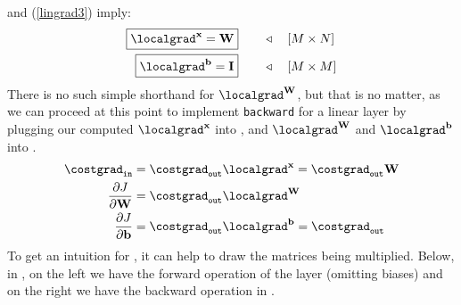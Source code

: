 \Eqns{\ref{lingrad1}} and (\ref{lingrad3}) imply:
\begin{align}
    \boxed{\localgrad^{\mathbf{x}} = \mathbf{W}} &\quad\quad \triangleleft \quad [M \times N]\\
    \boxed{\localgrad^{\mathbf{b}} = \mathbf{I}} &\quad\quad \triangleleft \quad [M \times M]
\end{align}
There is no such simple shorthand for $\localgrad^\mathbf{W}$, but that is no matter, as we can proceed at this point to implement \texttt{backward} for a linear layer by plugging our computed $\localgrad^\mathbf{x}$ into \eqn{\ref{eqn:backpropagation:backward}}, and $\localgrad^\mathbf{W}$ and $\localgrad^\mathbf{b}$ into \eqn{\ref{eqn:backpropagation:djdtheta}}.
\begin{align}
    \costgrad_{\texttt{in}} &= \costgrad_{\texttt{out}}\localgrad^{\mathbf{x}} = \costgrad_{\texttt{out}}\mathbf{W} \label{eqn:backpropagation:linear_backward_costgrad}\\
    \frac{\partial J}{\partial \mathbf{W}} &=  \costgrad_{\texttt{out}}\localgrad^{\mathbf{W}}\\
    \frac{\partial J}{\partial \mathbf{b}} &= \costgrad_{\texttt{out}}\localgrad^{\mathbf{b}} = \costgrad_{\texttt{out}}
\end{align}
To get an intuition for \eqn{\ref{eqn:backpropagation:linear_backward_costgrad}}, it can help to draw the matrices being multiplied. Below, in \fig{\ref{fig:backpropagation:linear_forward_backward_matrices}}, on the left we have the forward operation of the layer (omitting biases) and on the right we have the backward operation in \eqn{\ref{eqn:backpropagation:linear_backward_costgrad}}.
